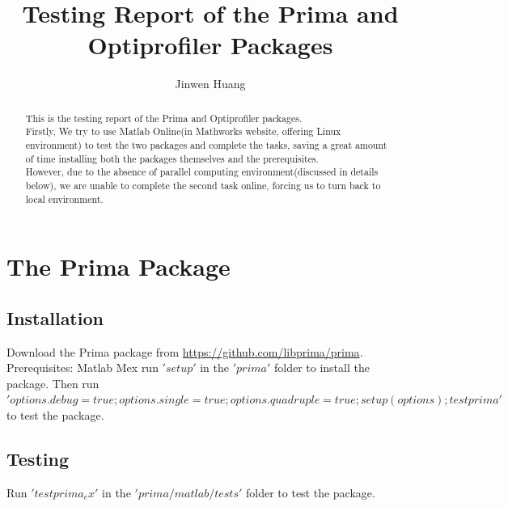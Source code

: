 \documentclass[12pt,a4paper,draft]{article}  %
\title{Testing Report of the Prima and Optiprofiler Packages}
\date{\DTMnow}
\author{
    Jinwen Huang
}
\theoremstyle{definition}
\numberwithin{equation}{section}
\begin{document}
\maketitle








\begin{abstract}
    This is the testing report of the Prima and Optiprofiler packages.\\
    Firstly, We try to use Matlab Online(in Mathworks website, offering Linux environment) to test the two packages and complete the tasks, saving a great amount of time installing both the packages themselves and the prerequisites.\\
    However, due to the absence of parallel computing environment(discussed in details below), we are unable to complete the second task online, forcing us to turn back to local environment.
\end{abstract}



\section{The Prima Package}

\subsection{Installation}
    Download the Prima package from \url{https://github.com/libprima/prima}.
    Prerequisites: Matlab Mex
    run \('setup'\) in the \('prima'\) folder to install the package.
    Then run \('options.debug=true; options.single=true; options.quadruple=true; setup(options); testprima
    '\) to test the package.

\subsection{Testing}
    Run \('testprima_ex'\) in the \('prima/matlab/tests'\) folder to test the package.
\end{document}

